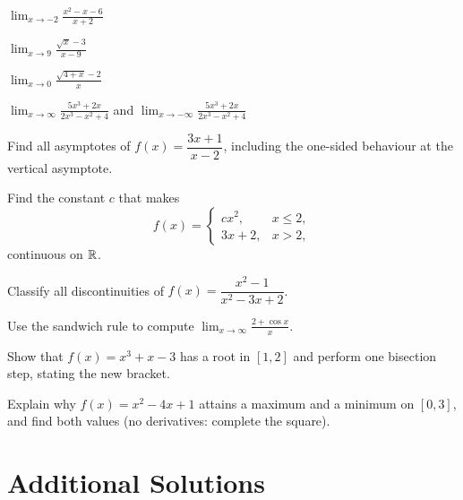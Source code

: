 \begin{problems}
  \item $\displaystyle\lim_{x\to -2}\frac{x^{2}-x-6}{x+2}$
  \item $\displaystyle\lim_{x\to 9}\frac{\sqrt{x}-3}{x-9}$
  \item $\displaystyle\lim_{x\to 0}\frac{\sqrt{4+x}-2}{x}$
  \item $\displaystyle\lim_{x\to\infty}\frac{5x^{3}+2x}{2x^{3}-x^{2}+4}$
        \quad and \quad
        $\displaystyle\lim_{x\to-\infty}\frac{5x^{3}+2x}{2x^{3}-x^{2}+4}$
  \item Find all asymptotes of $f(x)=\dfrac{3x+1}{x-2}$, including the
        one-sided behaviour at the vertical asymptote.
  \item Find the constant $c$ that makes
        \[
          f(x)=
          \begin{cases}
            cx^{2}, & x\le 2,\\
            3x+2,   & x>2,
          \end{cases}
        \]
        continuous on $\mathbb{R}$.
  \item Classify all discontinuities of
        $f(x)=\dfrac{x^{2}-1}{x^{2}-3x+2}$.
  \item Use the sandwich rule to compute
        $\displaystyle\lim_{x\to\infty}\frac{2+\cos x}{x}$.
  \item Show that $f(x)=x^{3}+x-3$ has a root in $[1,2]$ and perform
        one bisection step, stating the new bracket.
  \item Explain why $f(x)=x^{2}-4x+1$ attains a maximum and a minimum
        on $[0,3]$, and find both values (no derivatives: complete the
        square).
\end{problems}

\section{Additional Solutions}

